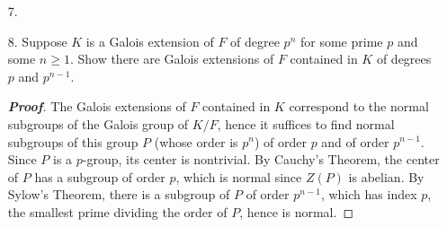 \documentclass[12pt,leqno]{article}
\theoremstyle{definition}
\newcommand{\Gal}{\operatorname{Gal}}
\newcommand{\w}{\omega}
\newcommand{\Q}{\mathbb{Q}}
\newcommand{\+}{\oplus}
\newenvironment{Proof}{\begin{proof}[\textnormal{\textbf{Proof}}]}{\end{proof}}
\begin{document}
\begin{enumerate}
\begin{Proof}
    Similarly, $[K:\Q]=[K:F_2][F_2:\Q]$, hence $[K:F_2]=8$. We see that, for any automorphism $\phi$ of $K/F_2$, $\phi(\sqrt[8]{2})^4=\phi(\sqrt{2})=\sqrt{2}$. This yields an automorphism of order 4 \begin{align*}\phi_1(\sqrt[8]{2})&=i\sqrt[8]{2}\\\phi_1(i)&=i\end{align*} and an automorphism of order 2 \begin{align*}\phi_2(\sqrt[8]{2})&=\sqrt[8]{2}\\\phi_2(i)&=-i\end{align*} We see that $\phi_2\circ\phi_1=\phi_1^{-1}\phi_2$ hence $\Gal(K/F_2)\cong D_8$.

    Finally, since $F_3=\Q(\sqrt{-2})$, we see that $\Gal(K/F_3)$ is generated by the automorphisms $\phi_1,\phi_2,\phi_3$, which map $\w\sqrt[8]{2}$ to the remaining primitive $8^{\text{th}}$ roots of $2$: \begin{align*}\phi_1(\w\sqrt[8]{2})&=\w^3\sqrt[8]{2}\\\phi_2(\w\sqrt[8]{2})&=\w^5\sqrt[8]{2}\\\phi_3(\w\sqrt[8]{2})&=\w^7\sqrt[8]{2}\end{align*} We see that the map \begin{align*}\text{Id}&\mapsto1\\\phi_1&\mapsto i\\\phi_2&\mapsto j\\\phi_3&\mapsto k\end{align*} describes an isomorphism from $\Gal(K/F_3)$ to $Q_8$.
    \end{Proof}
   \item [7.] 
   \item [8.] Suppose $K$ is a Galois extension of $F$ of degree $p^n$ for some prime $p$ and some $n\geq1$. Show there are Galois extensions of $F$ contained in $K$ of degrees $p$ and $p^{n-1}$.
    \begin{Proof}
     The Galois extensions of $F$ contained in $K$ correspond to the normal subgroups of the Galois group of $K/F$, hence it suffices to find normal subgroups of this group $P$ (whose order is $p^n$) of order $p$ and of order $p^{n-1}$. Since $P$ is a $p$-group, its center is nontrivial. By Cauchy's Theorem, the center of $P$ has a subgroup of order $p$, which is normal since $Z(P)$ is abelian. By Sylow's Theorem, there is a subgroup of $P$ of order $p^{n-1}$, which has index $p$, the smallest prime dividing the order of $P$, hence is normal. 
    \end{Proof}

\end{enumerate}
\end{document}
